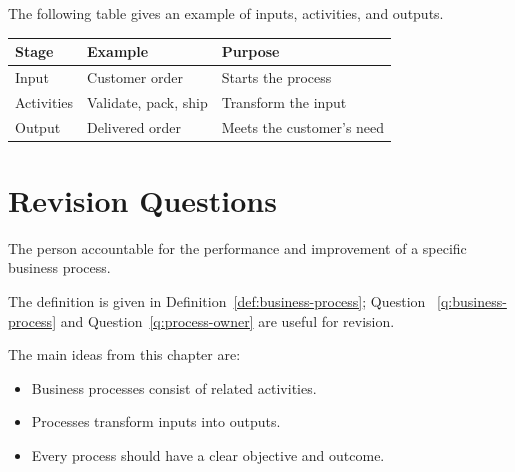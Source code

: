 The following table gives an example of inputs, activities, and outputs.
\begin{center}
  \begin{tabularx}{\textwidth}{@{}lYY@{}}
    \toprule
    Stage & Example & Purpose \\
    \midrule
    Input & Customer order & Starts the process \\
    Activities & Validate, pack, ship & Transform the input \\
    Output & Delivered order & Meets the customer's need \\
    \bottomrule
  \end{tabularx}
\end{center}

\section{Revision Questions}

\begin{questionlist}


  {The person accountable for the performance and improvement of a specific
  business process.}

\end{questionlist}

The definition is given in Definition~\ref{def:business-process}; Question~
\ref{q:business-process} and Question~\ref{q:process-owner} are useful for
revision.

\begin{summarybox}
The main ideas from this chapter are:
\begin{itemize}
  \item Business processes consist of related activities.
  \item Processes transform inputs into outputs.
  \item Every process should have a clear objective and outcome.
\end{itemize}
\end{summarybox}
